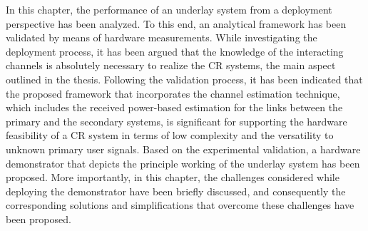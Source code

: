 In this chapter, the performance of an underlay system from a deployment perspective has been analyzed. To this end, an analytical framework has been validated by means of hardware measurements. 
While investigating the deployment process, it has been argued that the knowledge of the interacting channels is absolutely necessary to realize the CR systems, the main aspect outlined in the thesis. 
Following the validation process, it has been indicated that the proposed framework that incorporates the channel estimation technique, which includes the received power-based estimation for the links between the primary and the secondary systems, is significant for supporting the hardware feasibility of a CR system in terms of low complexity and the versatility to unknown primary user signals. Based on the experimental validation, a hardware demonstrator that depicts the principle working of the underlay system has been proposed. More importantly, in this chapter, the challenges considered while deploying the demonstrator have been briefly discussed, and consequently the corresponding solutions and simplifications that overcome these challenges have been proposed.  















